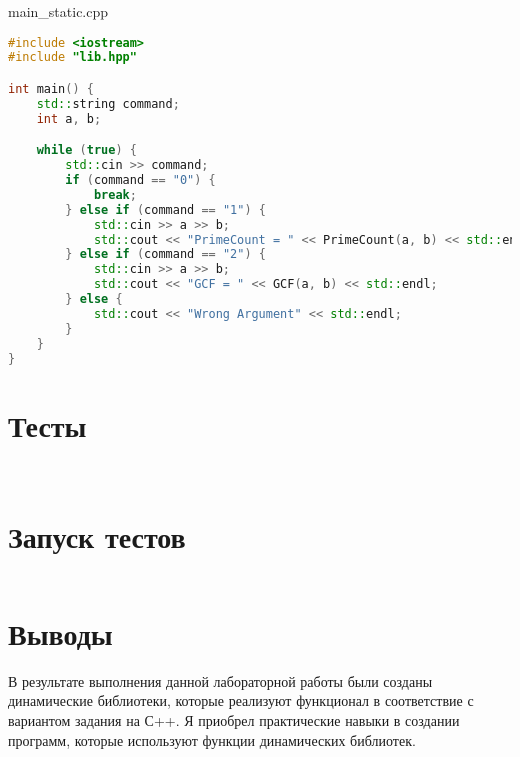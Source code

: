 \documentclass[a4paper, 12pt]{article}
\begin{document}
main\_static.cpp
\begin{lstlisting}[language=C++]
#include <iostream>
#include "lib.hpp"

int main() {
    std::string command;
    int a, b;

    while (true) {
        std::cin >> command;
        if (command == "0") {
            break;
        } else if (command == "1") {
            std::cin >> a >> b;
            std::cout << "PrimeCount = " << PrimeCount(a, b) << std::endl;
        } else if (command == "2") {
            std::cin >> a >> b;
            std::cout << "GCF = " << GCF(a, b) << std::endl;
        } else {
            std::cout << "Wrong Argument" << std::endl;
        }
    }
}
\end{lstlisting}

\newpage
\section{Тесты}
\begin{lstlisting}[language=C++]

\end{lstlisting}

\begin{lstlisting}[language=C++]

\end{lstlisting}
\newpage

\section{Запуск тестов}
\begin{verbatim}

\end{verbatim}
\newpage

\section{Выводы}

В результате выполнения данной лабораторной работы были созданы динамические библиотеки, которые реализуют функционал в соответствие с вариантом задания на С++. Я приобрел практические навыки в создании программ, которые используют функции динамических библиотек.
\end{document}
